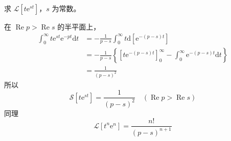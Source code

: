 \begin{example}{}
求 $\mathscr L[t\mathrm e^{st}]$，$s$ 为常数。

在 $\operatorname{Re} p>\operatorname{Re} s$ 的半平面上，
\begin{equation}
\begin{aligned} \int_{0}^{\infty} t \mathrm{e}^{s t} \mathrm{e}^{-p t} \mathrm{d} t &=-\frac{1}{p-s} \int_{0}^{\infty} t \mathrm{d}\left[\mathrm{e}^{-(p-s) t}\right] \\ &=-\frac{1}{p-s}\left\{\left[t \mathrm{e}^{-(p-s) t}\right]_{0}^{\infty}-\int_{0}^{\infty} \mathrm{e}^{-(p-s) t} \mathrm{d} t\right\} \\ &=\frac{1}{(p-s)^{2}} \end{aligned}
\end{equation}
所以
\begin{equation}
\mathscr{S}\left[t \mathrm{e}^{s t}\right]=\frac{1}{(p-s)^{2}} \quad(\operatorname{Re} p>\operatorname{Re} s)
\end{equation}
同理
\begin{equation}
\mathscr{L}\left[t^{n} \mathrm{e}^{n}\right]=\frac{n !}{(p-s)^{n+1}}
\end{equation}
\end{example}
